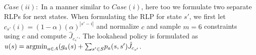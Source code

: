 $Case (ii):$ In a manner similar to $Case (i)$, here too we formulate two separate RLPs for next states. When formulating the RLP for state $s'$, we first let $c_{s'}(i)=(1-\alpha)(\alpha)^{|s'-i|}$ and normalize $c$ and sample $m=6$ constraints using $c$ and compute $\hat{J}_{c_s'}$. The lookahead policy is formulated as $u(s)={\operatorname{argmin}}_{a\in A}(g_a(s)+{\sum}_{s'\in S}p_a(s,s')\hat{J}_{c_{s'}}$.

